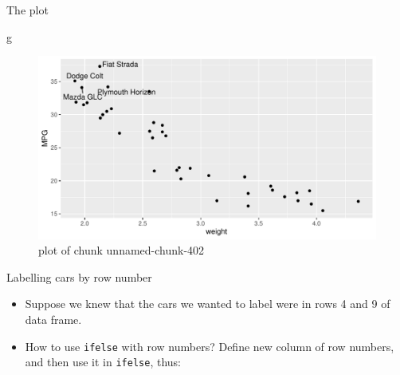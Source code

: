 \documentclass[
  ignorenonframetext,
]{beamer}
\newenvironment{Shaded}{\begin{snugshade}}{\end{snugshade}}
\newcommand{\DataTypeTok}[1]{\textcolor[rgb]{0.13,0.29,0.53}{#1}}
\newcommand{\DecValTok}[1]{\textcolor[rgb]{0.00,0.00,0.81}{#1}}
\newcommand{\KeywordTok}[1]{\textcolor[rgb]{0.13,0.29,0.53}{\textbf{#1}}}
\newcommand{\NormalTok}[1]{#1}
\newcommand{\OperatorTok}[1]{\textcolor[rgb]{0.81,0.36,0.00}{\textbf{#1}}}
\newcommand{\StringTok}[1]{\textcolor[rgb]{0.31,0.60,0.02}{#1}}
\providecommand{\tightlist}{%
  \setlength{\itemsep}{0pt}\setlength{\parskip}{0pt}}
\begin{document}
\begin{frame}[fragile]{The plot}
\protect\hypertarget{the-plot-5}{}

\begin{Shaded}
\begin{Highlighting}[]
\NormalTok{g}
\end{Highlighting}
\end{Shaded}

\begin{figure}
\centering
\includegraphics{figure/unnamed-chunk-402-1.pdf}
\caption{plot of chunk unnamed-chunk-402}
\end{figure}

\end{frame}

\begin{frame}[fragile]{Labelling cars by row number}
\protect\hypertarget{labelling-cars-by-row-number}{}

\begin{itemize}
\tightlist
\item
  Suppose we knew that the cars we wanted to label were in rows 4 and 9
  of data frame.
\item
  How to use \texttt{ifelse} with row numbers? Define new column of row
  numbers, and then use it in \texttt{ifelse}, thus:
\end{itemize}

\begin{Shaded}
\end{Shaded}

\end{frame}
\end{document}
